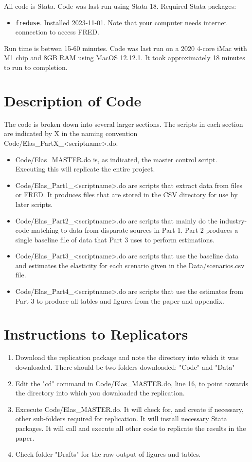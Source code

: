 \documentclass[11pt]{article}
\begin{document}
All code is Stata. Code was last run using Stata 18. Required Stata packages:
\begin{itemize}
	\item \texttt{freduse}. Installed 2023-11-01. Note that your computer needs internet connection to access FRED.
\end{itemize}

Run time is betwen 15-60 minutes. Code was last run on a 2020 4-core iMac with M1 chip and 8GB RAM using MacOS 12.12.1. It took approximately 18 minutes to run to completion.

\section{Description of Code}
The code is broken down into several larger sections. The scripts in each section are indicated by X in the naming convention Code/Elas\_PartX\_<scriptname>.do.

\begin{itemize}
	\item Code/Elas\_MASTER.do is, as indicated, the master control script. Executing this will replicate the entire project.
	\item Code/Elas\_Part1\_<scriptname>.do are scripts that extract data from files or FRED. It produces files that are stored in the CSV directory for use by later scripts. 
	\item Code/Elas\_Part2\_<scriptname>.do are scripts that mainly do the industry-code matching to data from disparate sources in Part 1. Part 2 produces a single baseline file of data that Part 3 uses to perform estimations.
	\item Code/Elas\_Part3\_<scriptname>.do are scripts that use the baseline data and estimates the elasticity for each scenario given in the Data/scenarios.csv file. 
	\item Code/Elas\_Part4\_<scriptname>.do are scripts that use the estimates from Part 3 to produce all tables and figures from the paper and appendix. 
\end{itemize}

\section{Instructions to Replicators}
\begin{enumerate}
	\item Download the replication package and note the directory into which it was downloaded. There should be two folders downloaded: "Code" and "Data"
	\item Edit the "cd" command in Code/Elas\_MASTER.do, line 16, to point towards the directory into which you downloaded the replication.
	\item Excecute Code/Elas\_MASTER.do. It will check for, and create if necessary, other sub-folders required for replication. It will install necessary Stata packages. It will call and execute all other code to replicate the results in the paper.
	\item Check folder "Drafts" for the raw output of figures and tables.
\end{enumerate}
\end{document}
